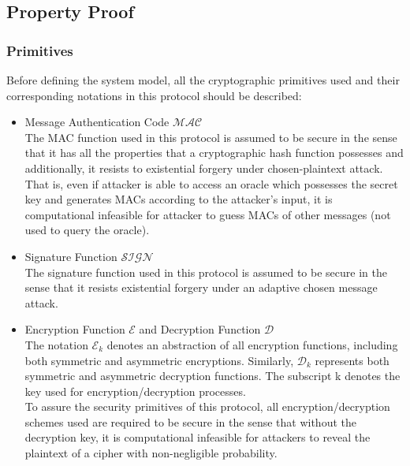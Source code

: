 \documentclass[10pt,a4paper]{article}
\begin{document}
\subsection*{Property Proof}
\subsubsection*{Primitives}
Before defining the system model, all the cryptographic primitives used and their corresponding notations in this protocol should be described:
\begin{itemize}
\item Message Authentication Code $\mathcal{MAC}$\\
The MAC function used in this protocol is assumed to be secure in the sense that it has all the properties that a cryptographic hash function possesses and additionally, it resists to existential forgery under chosen-plaintext attack. That is, even if attacker is able to access an oracle which possesses the secret key and generates MACs according to the attacker's input, it is computational infeasible for attacker to guess MACs of other messages (not used to query the oracle).

\item Signature Function $\mathcal{SIGN}$\\
The signature function used in this protocol is assumed to be secure in the sense that it resists existential forgery under an adaptive chosen message attack. \cite{goldwasser}

\item Encryption Function $\mathcal{E}$ and Decryption Function $\mathcal{D}$\\
The notation $\mathcal{E}_k$ denotes an abstraction of all encryption functions, including both symmetric and asymmetric encryptions. Similarly, $\mathcal{D}_k$ represents both symmetric and asymmetric decryption functions. The subscript k denotes the key used for encryption/decryption processes.\\
To assure the security primitives of this protocol, all encryption/decryption schemes used are required to be secure in the sense that without the decryption key, it is computational infeasible for attackers to reveal the plaintext of a cipher with non-negligible probability.


\end{itemize}
\end{document}
